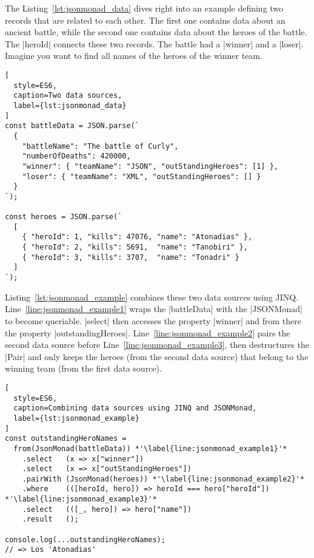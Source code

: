 The Listing~\ref{lst:jsonmonad_data} dives right into an example defining two
records that are related to each other. The first one contains data about an
ancient battle, while the second one contains data about the heroes of the
battle. The |heroId| connects these two records. The battle had a |winner| and
a |loser|. Imagine you want to find all names of the heroes of the winner team.

\begin{lstlisting}[
  style=ES6,
  caption=Two data sources,
  label={lst:jsonmonad_data}
]
const battleData = JSON.parse(`
  {
    "battleName": "The battle of Curly",
    "numberOfDeaths": 420000,
    "winner": { "teamName": "JSON", "outStandingHeroes": [1] },
    "loser": { "teamName": "XML", "outStandingHeroes": [] }
  }
`);

const heroes = JSON.parse(`
  [
    { "heroId": 1, "kills": 47076, "name": "Atonadias" },
    { "heroId": 2, "kills": 5691,  "name": "Tanobiri" },
    { "heroId": 3, "kills": 3707,  "name": "Tonadri" }
  ]
`);
\end{lstlisting}

Listing~\ref{lst:jsonmonad_example} combines these two data sources using JINQ.
Line~\ref{line:jsonmonad_example1} wraps the |battleData| with the |JSONMonad|
to become queriable. |select| then accesses the property |winner| and from
there the property |outstandingHeroes|. Line~\ref{line:jsonmonad_example2}
pairs the second data source before Line~\ref{line:jsonmonad_example3}, then
destructures the |Pair| and only keeps the heroes (from the second data source)
that belong to the winning team (from the first data source).

\begin{lstlisting}[
  style=ES6,
  caption=Combining data sources using JINQ and JSONMonad,
  label={lst:jsonmonad_example}
]
const outstandingHeroNames =
  from(JsonMonad(battleData)) *'\label{line:jsonmonad_example1}'*
    .select   (x => x["winner"])
    .select   (x => x["outStandingHeroes"])
    .pairWith (JsonMonad(heroes)) *'\label{line:jsonmonad_example2}'*
    .where    (([heroId, hero]) => heroId === hero["heroId"]) *'\label{line:jsonmonad_example3}'*
    .select   (([_, hero]) => hero["name"])
    .result   ();

console.log(...outstandingHeroNames);
// => Los 'Atonadias'
\end{lstlisting}

